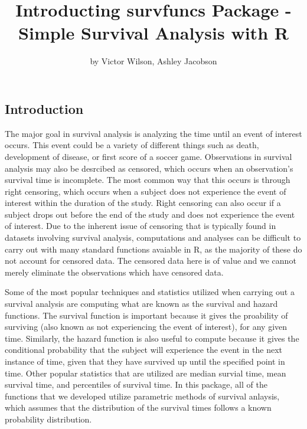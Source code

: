 \title{Introducting survfuncs Package - Simple Survival Analysis with R}
\author{by Victor Wilson, Ashley Jacobson}

\maketitle



\hypertarget{introduction}{%
\subsection{Introduction}\label{introduction}}

The major goal in survival analysis is analyzing the time until an event
of interest occurs. This event could be a variety of different things
such as death, development of disease, or first score of a soccer game.
Observations in survival analysis may also be desrcibed as censored,
which occurs when an observation's survival time is incomplete. The most
common way that this occurs is through right censoring, which occurs
when a subject does not experience the event of interest within the
duration of the study. Right censoring can also occur if a subject drops
out before the end of the study and does not experience the event of
interest. Due to the inherent issue of censoring that is typically found
in datasets involving survival analysis, computations and analyses can
be difficult to carry out with many standard functions avaiable in R, as
the majority of these do not account for censored data. The censored
data here is of value and we cannot merely eliminate the observations
which have censored data.

Some of the most popular techniques and statistics utilized when
carrying out a survival analysis are computing what are known as the
survival and hazard functions. The survival function is important
because it gives the proability of surviving (also known as not
experiencing the event of interest), for any given time. Similarly, the
hazard function is also useful to compute because it gives the
conditional probability that the subject will experience the event in
the next instance of time, given that they have survived up until the
specified point in time. Other popular statistics that are utilized are
median survial time, mean survival time, and percentiles of survival
time. In this package, all of the functions that we developed utilize
parametric methods of survival anlaysis, which assumes that the
distribution of the survival times follows a known probability
distribution.

